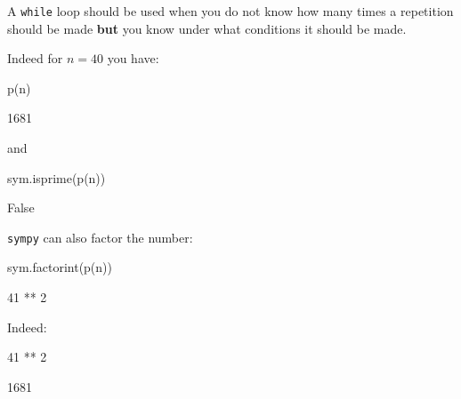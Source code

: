 \begin{note}
A \texttt{while} loop should be used when you do not know how many times a repetition
should be made \textbf{but} you know under what conditions it should be made.
\end{note}



Indeed for \(n=40\) you have:




\begin{pyin}
p(n)
\end{pyin}





\begin{raw}
1681
\end{raw}





and




\begin{pyin}
sym.isprime(p(n))
\end{pyin}





\begin{raw}
False
\end{raw}





\texttt{sympy} can also factor the number:




\begin{pyin}
sym.factorint(p(n))
\end{pyin}





\begin{pyin}
41 ** 2
\end{pyin}





Indeed:




\begin{pyin}
41 ** 2
\end{pyin}





\begin{raw}
1681
\end{raw}







